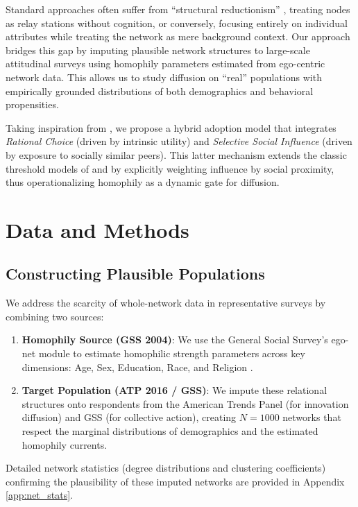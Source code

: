 \documentclass[11pt, a4paper]{article}
\begin{document}
Standard approaches often suffer from ``structural reductionism'' \citep{Goldberg2021}, treating nodes as relay stations without cognition, or conversely, focusing entirely on individual attributes while treating the network as mere background context. Our approach bridges this gap by imputing plausible network structures to large-scale attitudinal surveys using homophily parameters estimated from ego-centric network data. This allows us to study diffusion on ``real'' populations with empirically grounded distributions of both demographics and behavioral propensities.

Taking inspiration from \citet{Tur2024}, we propose a hybrid adoption model that integrates \textit{Rational Choice} (driven by intrinsic utility) and \textit{Selective Social Influence} (driven by exposure to socially similar peers). This latter mechanism extends the classic threshold models of \citet{Valente1996} and \citet{Granovetter1978} by explicitly weighting influence by social proximity, thus operationalizing homophily as a dynamic gate for diffusion.

\section{Data and Methods}
\label{sec:methods}

\subsection{Constructing Plausible Populations}
We address the scarcity of whole-network data in representative surveys by combining two sources:
\begin{enumerate}
    \item \textbf{Homophily Source (GSS 2004)}: We use the General Social Survey's ego-net module to estimate homophilic strength parameters across key dimensions: Age, Sex, Education, Race, and Religion \citep{McPherson1987, McPherson2001}.
    \item \textbf{Target Population (ATP 2016 / GSS)}: We impute these relational structures onto respondents from the American Trends Panel (for innovation diffusion) and GSS (for collective action), creating $N=1000$ networks that respect the marginal distributions of demographics and the estimated homophily currents.
\end{enumerate}

Detailed network statistics (degree distributions and clustering coefficients) confirming the plausibility of these imputed networks are provided in Appendix \ref{app:net_stats}.
\end{document}
